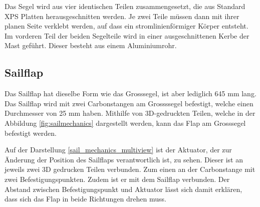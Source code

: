 Das Segel wird aus vier identischen Teilen zusammengesetzt, die aus Standard XPS Platten herausgeschnitten werden. Je zwei Teile müssen dann mit ihrer planen Seite verklebt werden, auf dass ein stromlinienförmiger Körper entsteht. Im vorderen Teil der beiden Segelteile wird in einer ausgeschnittenen Kerbe der Mast geführt. Dieser besteht aus einem Aluminiumrohr.
\subsection{Sailflap}
\label{sec:sailflap}
Das Sailflap hat dieselbe Form wie das Grosssegel, ist aber lediglich 645 mm lang. Das Sailflap wird mit zwei Carbonstangen am Grossssegel befestigt, welche einen Durchmesser von 25 mm haben. Mithilfe von 3D-gedruckten Teilen, welche in der Abbildung \ref{fig:sailmechanics} dargestellt werden, kann das Flap am Grosssegel befestigt werden.

Auf der Darstellung \ref{sail_mechanics_multiview} ist der Aktuator, der zur Änderung der Position des Sailflaps verantwortlich ist, zu sehen. Dieser ist an jeweils zwei 3D gedrucken Teilen verbunden. Zum einen an der Carbonstange mit zwei Befestigungspunkten. Zudem ist er mit dem Sailflap verbunden. Der Abstand zwischen Befestigungspunkt und Aktuator lässt sich damit erklären, dass sich das Flap in beide Richtungen drehen muss.

